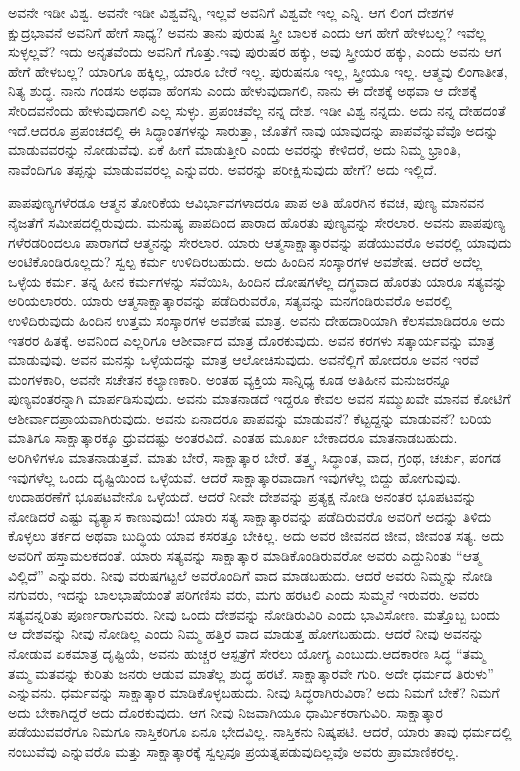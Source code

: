ಅವನೇ ಇಡೀ ವಿಶ್ವ. ಅವನೇ ಇಡೀ ವಿಶ್ವವೆನ್ನಿ, ಇಲ್ಲವೆ ಅವನಿಗೆ ವಿಶ್ವವೇ ಇಲ್ಲ ಎನ್ನಿ. ಆಗ ಲಿಂಗ ದೇಶಗಳ ಕ್ಷುದ್ರಭಾವನೆ ಅವನಿಗೆ ಹೇಗೆ ಸಾಧ್ಯ? ಅವನು ತಾನು ಪುರುಷ ಸ್ತ್ರೀ ಬಾಲಕ ಎಂದು ಆಗ ಹೇಗೆ ಹೇಳಬಲ್ಲ? ಇವೆಲ್ಲ ಸುಳ್ಳಲ್ಲವೆ? ಇದು ಅನೃತವೆಂದು ಅವನಿಗೆ ಗೊತ್ತು.ಇವು ಪುರುಷರ ಹಕ್ಕು, ಅವು ಸ್ತ್ರೀಯರ ಹಕ್ಕು, ಎಂದು ಅವನು ಆಗ ಹೇಗೆ ಹೇಳಬಲ್ಲ? ಯಾರಿಗೂ ಹಕ್ಕಿಲ್ಲ, ಯಾರೂ ಬೇರೆ ಇಲ್ಲ. ಪುರುಷನೂ ಇಲ್ಲ, ಸ್ತ್ರೀಯೂ ಇಲ್ಲ. ಆತ್ಮವು ಲಿಂಗಾತೀತ, ನಿತ್ಯ ಶುದ್ಧ. ನಾನು ಗಂಡಸು ಅಥವಾ ಹೆಂಗಸು ಎಂದು ಹೇಳುವುದಾಗಲಿ, ನಾನು ಈ ದೇಶಕ್ಕೆ ಅಥವಾ ಆ ದೇಶಕ್ಕೆ ಸೇರಿದವನೆಂದು ಹೇಳುವುದಾಗಲಿ ಎಲ್ಲ ಸುಳ್ಳು. ಪ್ರಪಂಚವೆಲ್ಲ ನನ್ನ ದೇಶ. ಇಡೀ ವಿಶ್ವ ನನ್ನದು. ಅದು ನನ್ನ ದೇಹದಂತೆ ಇದೆ.ಆದರೂ ಪ್ರಪಂಚದಲ್ಲಿ ಈ ಸಿದ್ಧಾಂತಗಳನ್ನು ಸಾರುತ್ತಾ, ಜೊತೆಗೆ ನಾವು ಯಾವುದನ್ನು ಪಾಪವೆನ್ನುವೆವೊ ಅದನ್ನು ಮಾಡುವವರನ್ನು ನೋಡುವೆವು. ಏಕೆ ಹೀಗೆ ಮಾಡುತ್ತೀರಿ ಎಂದು ಅವರನ್ನು ಕೇಳಿದರೆ, ಅದು ನಿಮ್ಮ ಭ್ರಾಂತಿ, ನಾವೆಂದಿಗೂ ತಪ್ಪನ್ನು ಮಾಡುವವರಲ್ಲ ಎನ್ನುವರು. ಅವರನ್ನು ಪರೀಕ್ಷಿಸುವುದು ಹೇಗೆ? ಅದು ಇಲ್ಲಿದೆ.

ಪಾಪಪುಣ್ಯಗಳೆರಡೂ ಆತ್ಮನ ತೋರಿಕೆಯ ಆವಿರ್ಭಾವಗಳಾದರೂ ಪಾಪ ಅತಿ ಹೊರಗಿನ ಕವಚ, ಪುಣ್ಯ ಮಾನವನ ನೈಜತೆಗೆ ಸಮೀಪದಲ್ಲಿರುವುದು. ಮನುಷ್ಯ ಪಾಪದಿಂದ ಪಾರಾದ ಹೊರತು ಪುಣ್ಯವನ್ನು ಸೇರಲಾರ. ಅವನು ಪಾಪಪುಣ್ಯ ಗಳೆರಡರಿಂದಲೂ ಪಾರಾಗದೆ ಆತ್ಮನನ್ನು ಸೇರಲಾರ. ಯಾರು ಆತ್ಮಸಾಕ್ಷಾತ್ಕಾರವನ್ನು ಪಡೆಯುವರೊ ಅವರಲ್ಲಿ ಯಾವುದು ಅಂಟಿಕೊಂಡಿರೂಲ್ಲದು? ಸ್ವಲ್ಪ ಕರ್ಮ ಉಳಿದಿರಬಹುದು. ಅದು ಹಿಂದಿನ ಸಂಸ್ಕಾರಗಳ ಅವಶೇಷ. ಆದರೆ ಅದೆಲ್ಲ ಒಳ್ಳೆಯ ಕರ್ಮ. ತನ್ನ ಹೀನ ಕರ್ಮಗಳನ್ನು ಸವೆಯಿಸಿ, ಹಿಂದಿನ ದೋಷಗಳೆಲ್ಲ ದಗ್ಧವಾದ ಹೊರತು ಯಾರೂ ಸತ್ಯವನ್ನು ಅರಿಯಲಾರರು. ಯಾರು ಆತ್ಮಸಾಕ್ಷಾತ್ಕಾರವನ್ನು ಪಡೆದಿರುವರೊ, ಸತ್ಯವನ್ನು ಮನಗಂಡಿರುವರೊ ಅವರಲ್ಲಿ ಉಳಿದಿರುವುದು ಹಿಂದಿನ ಉತ್ತಮ ಸಂಸ್ಕಾರಗಳ ಅವಶೇಷ ಮಾತ್ರ. ಅವನು ದೇಹದಾರಿಯಾಗಿ ಕೆಲಸಮಾಡಿದರೂ ಅದು ಇತರರ ಹಿತಕ್ಕೆ. ಅವನಿಂದ ಎಲ್ಲರಿಗೂ ಆಶೀರ್ವಾದ ಮಾತ್ರ ದೊರಕುವುದು. ಅವನ ಕರಗಳು ಸತ್ಕಾರ್ಯವನ್ನು ಮಾತ್ರ ಮಾಡುವುವು. ಅವನ ಮನಸ್ಸು ಒಳ್ಳೆಯದನ್ನು ಮಾತ್ರ ಆಲೋಚಿಸುವುದು. ಅವನೆಲ್ಲಿಗೆ ಹೋದರೂ ಅವನ ಇರವೆ ಮಂಗಳಕಾರಿ, ಅವನೇ ಸಚೇತನ ಕಲ್ಯಾಣಕಾರಿ. ಅಂತಹ ವ್ಯಕ್ತಿಯ ಸಾನ್ನಿಧ್ಯ ಕೂಡ ಅತಿಹೀನ ಮನುಜರನ್ನೂ ಪುಣ್ಯವಂತರನ್ನಾಗಿ ಮಾರ್ಪಡಿಸುವುದು. ಅವನು ಮಾತನಾಡದೆ ಇದ್ದರೂ ಕೇವಲ ಅವನ ಸಮ್ಮುಖವೇ ಮಾನವ ಕೋಟಿಗೆ ಆಶೀರ್ವಾದಪ್ರಾಯವಾಗಿರುವುದು. ಅವನು ಏನಾದರೂ ಪಾಪವನ್ನು ಮಾಡುವನೆ? ಕೆಟ್ಟದ್ದನ್ನು ಮಾಡುವನೆ? ಬರಿಯ ಮಾತಿಗೂ ಸಾಕ್ಷಾತ್ಕಾರಕ್ಕೂ ಧ್ರುವದಷ್ಟು ಅಂತರವಿದೆ. ಎಂತಹ ಮೂರ್ಖ ಬೇಕಾದರೂ ಮಾತನಾಡಬಹುದು. ಅರಿಗಿಳಿಗಳೂ ಮಾತನಾಡುತ್ತವೆ. ಮಾತು ಬೇರೆ, ಸಾಕ್ಷಾತ್ಕಾರ ಬೇರೆ. ತತ್ತ್ವ, ಸಿದ್ಧಾಂತ, ವಾದ, ಗ್ರಂಥ, ಚರ್ಚು, ಪಂಗಡ ಇವುಗಳೆಲ್ಲ ಒಂದು ದೃಷ್ಟಿಯಿಂದ ಒಳ್ಳೆಯವೆ. ಆದರೆ ಸಾಕ್ಷಾತ್ಕಾರವಾದಾಗ ಇವುಗಳೆಲ್ಲ ಬಿದ್ದು ಹೋಗುವುವು. ಉದಾಹರಣೆಗೆ ಭೂಪಟವೇನೊ ಒಳ್ಳೆಯದೆ. ಆದರೆ ನೀವೇ ದೇಶವನ್ನು ಪ್ರತ್ಯಕ್ಷ ನೋಡಿ ಅನಂತರ ಭೂಪಟವನ್ನು ನೋಡಿದರೆ ಎಷ್ಟು ವ್ಯತ್ಯಾಸ ಕಾಣುವುದು! ಯಾರು ಸತ್ಯ ಸಾಕ್ಷಾತ್ಕಾರವನ್ನು ಪಡೆದಿರುವರೊ ಅವರಿಗೆ ಅದನ್ನು ತಿಳಿದು ಕೊಳ್ಳಲು ತರ್ಕದ ಅಥವಾ ಬುದ್ಧಿಯ ಯಾವ ಕಸರತ್ತೂ ಬೇಕಿಲ್ಲ. ಅದು ಅವರ ಜೀವನದ ಜೀವ, ಜೀವಂತ ಸತ್ಯ. ಅದು ಅವರಿಗೆ ಹಸ್ತಾಮಲಕದಂತೆ. ಯಾರು ಸತ್ಯವನ್ನು ಸಾಕ್ಷಾತ್ಕಾರ ಮಾಡಿಕೊಂಡಿರುವರೋ ಅವರು ಎದ್ದುನಿಂತು “ಆತ್ಮ ವಿಲ್ಲಿದೆ” ಎನ್ನುವರು. ನೀವು ವರುಷಗಟ್ಟಲೆ ಅವರೊಂದಿಗೆ ವಾದ ಮಾಡಬಹುದು. ಆದರೆ ಅವರು ನಿಮ್ಮನ್ನು ನೋಡಿ ನಗುವರು, ಇದನ್ನು ಬಾಲಭಾಷೆಯಂತೆ ಪರಿಗಣಿಸು ವರು, ಮಗು ಹರಟಲಿ ಎಂದು ಸುಮ್ಮನೆ ಇರುವರು. ಅವರು ಸತ್ಯವನ್ನರಿತು ಪೂರ್ಣರಾಗುವರು. ನೀವು ಒಂದು ದೇಶವನ್ನು ನೋಡಿರುವಿರಿ ಎಂದು ಭಾವಿಸೋಣ. ಮತ್ತೊಬ್ಬ ಬಂದು ಆ ದೇಶವನ್ನು ನೀವು ನೋಡಿಲ್ಲ ಎಂದು ನಿಮ್ಮ ಹತ್ತಿರ ವಾದ ಮಾಡುತ್ತ ಹೋಗಬಹುದು. ಆದರೆ ನೀವು ಅವನನ್ನು ನೋಡುವ ಏಕಮಾತ್ರ ದೃಷ್ಟಿಯೆ, ಅವನು ಹುಚ್ಚರ ಆಸ್ಪತ್ರೆಗೆ ಸೇರಲು ಯೋಗ್ಯ ಎಂಬುದು.ಆದಕಾರಣ ಸಿದ್ಧ “ತಮ್ಮ ತಮ್ಮ ಮತವನ್ನು ಕುರಿತು ಜನರು ಆಡುವ ಮಾತೆಲ್ಲ ಶುದ್ಧ ಹರಟೆ. ಸಾಕ್ಷಾತ್ಕಾರವೇ ಗುರಿ. ಅದೇ ಧರ್ಮದ ತಿರುಳು” ಎನ್ನುವನು. ಧರ್ಮವನ್ನು ಸಾಕ್ಷಾತ್ಕಾರ ಮಾಡಿಕೊಳ್ಳಬಹುದು. ನೀವು ಸಿದ್ಧರಾಗಿರುವಿರಾ? ಅದು ನಿಮಗೆ ಬೇಕೆ? ನಿಮಗೆ ಅದು ಬೇಕಾಗಿದ್ದರೆ ಅದು ದೊರಕುವುದು. ಆಗ ನೀವು ನಿಜವಾಗಿಯೂ ಧಾರ್ಮಿಕರಾಗುವಿರಿ. ಸಾಕ್ಷಾತ್ಕಾರ ಪಡೆಯುವವರೆಗೂ ನಿಮಗೂ ನಾಸ್ತಿಕರಿಗೂ ಏನೂ ಭೇದವಿಲ್ಲ. ನಾಸ್ತಿಕನು ನಿಷ್ಕಪಟಿ. ಆದರೆ, ಯಾರು ತಾವು ಧರ್ಮದಲ್ಲಿ ನಂಬುವೆವು ಎನ್ನುವರೊ ಮತ್ತು ಸಾಕ್ಷಾತ್ಕಾರಕ್ಕೆ ಸ್ವಲ್ಪವೂ ಪ್ರಯತ್ನಪಡುವುದಿಲ್ಲವೊ ಅವರು ಪ್ರಾಮಾಣಿಕರಲ್ಲ.

